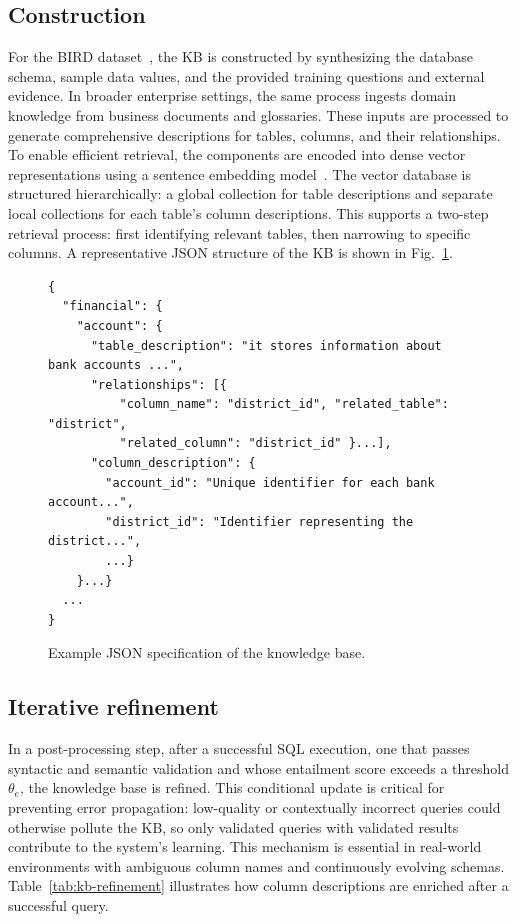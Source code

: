 \subsection{Construction}
For the BIRD dataset~\cite{li2023bird}, the KB is constructed by synthesizing the database schema, sample data values, and the provided training questions and external evidence. In broader enterprise settings, the same process ingests domain knowledge from business documents and glossaries. These inputs are processed to generate comprehensive descriptions for tables, columns, and their relationships. To enable efficient retrieval, the components are encoded into dense vector representations using a sentence embedding model~\cite{reimers2019sentence}. The vector database is structured hierarchically: a global collection for table descriptions and separate local collections for each table's column descriptions. This supports a two-step retrieval process: first identifying relevant tables, then narrowing to specific columns. A representative JSON structure of the KB is shown in Fig.~\ref{fig:kb-json}.

\begin{figure}[ht]
\centering
\begin{minipage}{\linewidth}
\footnotesize
\begin{verbatim}
{
  "financial": {
    "account": {
      "table_description": "it stores information about bank accounts ...",
      "relationships": [{
          "column_name": "district_id", "related_table": "district",
          "related_column": "district_id" }...],
      "column_description": {
        "account_id": "Unique identifier for each bank account...",
        "district_id": "Identifier representing the district...",
        ...}
    }...}
  ...
}
\end{verbatim}
\end{minipage}
\caption{Example JSON specification of the knowledge base.}
\label{fig:kb-json}
\end{figure}

\subsection{Iterative refinement}
In a post-processing step, after a successful SQL execution, one that passes syntactic and semantic validation and whose entailment score exceeds a threshold $\theta_e$, the knowledge base is refined. This conditional update is critical for preventing error propagation: low-quality or contextually incorrect queries could otherwise pollute the KB, so only validated queries with validated results contribute to the system's learning. This mechanism is essential in real-world environments with ambiguous column names and continuously evolving schemas. Table~\ref{tab:kb-refinement} illustrates how column descriptions are enriched after a successful query.

